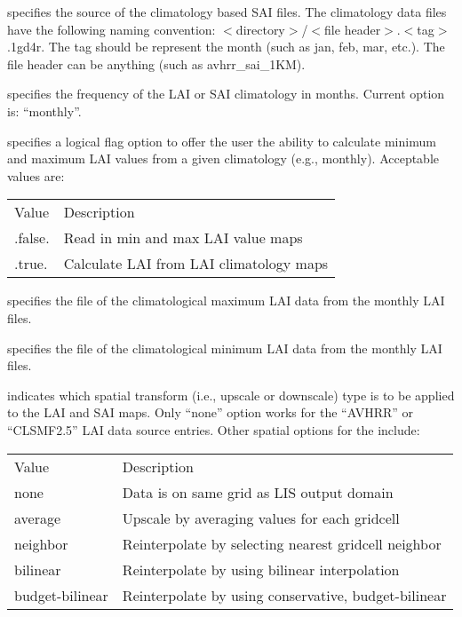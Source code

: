   specifies the source of the climatology based
 SAI files. The climatology data files have the following
 naming convention: $<$directory$>$/$<$file header$>$.$<$tag$>$.1gd4r.
 The tag should be represent the month (such as jan, feb, mar, etc.).
 The file header can be anything (such as avhrr\_sai\_1KM).

  specifies the frequency of the
 LAI or SAI climatology in months. Current option is:  ``monthly''.

  specifies a
 logical flag option to offer the user the ability to calculate
 minimum and maximum LAI values from a given climatology (e.g., monthly).
 Acceptable values are:

 \begin{tabular}{ll}
 Value     & Description                                \\
 .false.   & Read in min and max LAI value maps         \\
 .true.    & Calculate LAI from LAI climatology maps    \\
 \end{tabular}

  specifies the file of the
 climatological maximum LAI data from the monthly
 LAI files.

  specifies the file of the
 climatological minimum LAI data from the monthly
 LAI files.

  indicates which spatial transform
 (i.e., upscale or downscale) type is to be applied to the LAI and SAI
 maps.  Only ``none'' option works for the ``AVHRR'' or ``CLSMF2.5'' 
 LAI data source entries.  Other spatial options for the include:

 \begin{tabular}{ll}
 Value   & Description                                   \\
 none    & Data is on same grid as LIS output domain     \\
 average         & Upscale by averaging values for each gridcell        \\
 neighbor        & Reinterpolate by selecting nearest gridcell neighbor \\
 bilinear        & Reinterpolate by using bilinear interpolation        \\
 budget-bilinear & Reinterpolate by using conservative, budget-bilinear \\
 \end{tabular}
 


